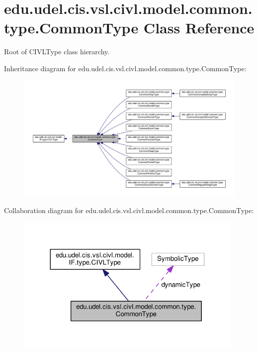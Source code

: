 \hypertarget{classedu_1_1udel_1_1cis_1_1vsl_1_1civl_1_1model_1_1common_1_1type_1_1CommonType}{}\section{edu.\+udel.\+cis.\+vsl.\+civl.\+model.\+common.\+type.\+Common\+Type Class Reference}
\label{classedu_1_1udel_1_1cis_1_1vsl_1_1civl_1_1model_1_1common_1_1type_1_1CommonType}


Root of C\+I\+V\+L\+Type class hierarchy.  




Inheritance diagram for edu.\+udel.\+cis.\+vsl.\+civl.\+model.\+common.\+type.\+Common\+Type\+:
\nopagebreak
\begin{figure}[H]
\begin{center}
\leavevmode
\includegraphics[width=350pt]{classedu_1_1udel_1_1cis_1_1vsl_1_1civl_1_1model_1_1common_1_1type_1_1CommonType__inherit__graph}
\end{center}
\end{figure}


Collaboration diagram for edu.\+udel.\+cis.\+vsl.\+civl.\+model.\+common.\+type.\+Common\+Type\+:
\nopagebreak
\begin{figure}[H]
\begin{center}
\leavevmode
\includegraphics[width=312pt]{classedu_1_1udel_1_1cis_1_1vsl_1_1civl_1_1model_1_1common_1_1type_1_1CommonType__coll__graph}
\end{center}
\end{figure}

